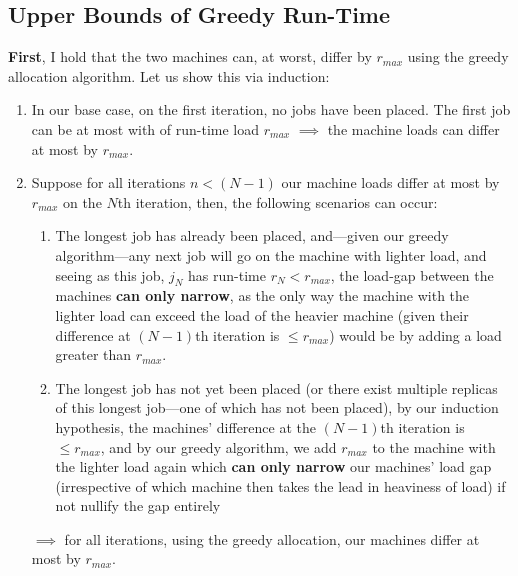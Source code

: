 \documentclass[conference]{styles/acmsiggraph}
\newcommand{\?}{\stackrel{?}{=}}
\begin{document}
\subsection{Upper Bounds of Greedy Run-Time} \label{section:upperBound}
\textbf{First}, I hold that the two machines can, at worst, differ by $r_{max}$ using the greedy allocation algorithm.  Let us show this via induction: 
\begin{enumerate}
    \item In our base case, on the first iteration, no jobs have been placed.  The first job can be at most with of run-time load $r_{max}$ $\implies$ the machine loads can differ at most by $r_{max}$.
    \item Suppose for all iterations $n < (N-1)$ our machine loads differ at most by $r_{max}$ on the $N$th iteration, then, the following scenarios can occur:
    
    \begin{enumerate}
        \item The longest job has already been placed, and---given our greedy algorithm---any next job will go on the machine with lighter load, and seeing as this job, $j_N$ has run-time $r_N < r_{max}$, the load-gap between the machines \textbf{can only narrow}, as the only way the machine with the lighter load can exceed the load of the heavier machine (given their difference at $(N-1)$th iteration is $\leq r_{max}$) would be by adding a load greater than $r_{max}$.
        \item The longest job has not yet been placed (or there exist multiple replicas of this longest job---one of which has not been placed), by our induction hypothesis, the machines' difference at the $(N-1)$th iteration is $\leq r_{max}$, and by our greedy algorithm, we add $r_{max}$ to the machine with the lighter load again which  \textbf{can only narrow} our machines' load gap (irrespective of which machine then takes the lead in heaviness of load) if not nullify the gap entirely
    \end{enumerate}
    $\implies$ for all iterations, using the greedy allocation, our machines differ at most by $r_{max}$.
\end{enumerate}
\end{document}
